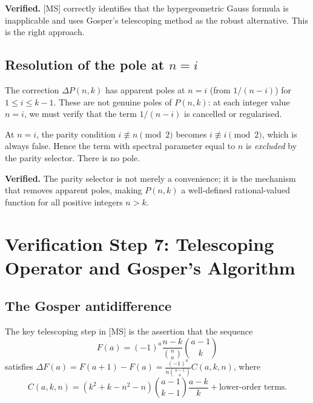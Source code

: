 \documentclass[12pt, a4paper]{amsart}
\theoremstyle{plain}
\theoremstyle{definition}
\theoremstyle{remark}
\newcommand{\deltap}{\Delta P(n,k)}
\begin{document}
\textcolor{verified}{\textbf{Verified.}}  [MS] correctly identifies that the
hypergeometric Gauss formula is inapplicable and uses Gosper's telescoping method
as the robust alternative.  This is the right approach.

\subsection{Resolution of the pole at $n=i$}

The correction $\deltap$ has apparent poles at $n=i$ (from $1/(n-i)$) for
$1\le i\le k-1$.  These are not genuine poles of $P(n,k)$: at each integer value
$n=i$, we must verify that the term $1/(n-i)$ is cancelled or regularised.

At $n=i$, the parity condition $i\not\equiv n\pmod 2$ becomes $i\not\equiv i\pmod 2$,
which is always false.  Hence the term with spectral parameter equal to $n$ is
\emph{excluded} by the parity selector.  There is no pole.

\textcolor{verified}{\textbf{Verified.}}  The parity selector is not merely a
convenience; it is the mechanism that removes apparent poles, making $P(n,k)$ a
well-defined rational-valued function for all positive integers $n>k$.

\section{Verification Step 7: Telescoping Operator and Gosper's Algorithm}
\label{sec:step7}

\subsection{The Gosper antidifference}

The key telescoping step in [MS] is the assertion that the sequence
\[
  F(a) = (-1)^a\frac{n-k}{\binom{n}{a}}\binom{a-1}{k}
\]
satisfies $\Delta F(a) = F(a+1)-F(a) = \frac{(-1)^a}{n\binom{n-1}{a}}C(a,k,n)$,
where
\[
  C(a,k,n) = (k^2+k-n^2-n)\binom{a-1}{k-1}\frac{a-k}{k}
             + \text{lower-order terms}.
\]
\end{document}
